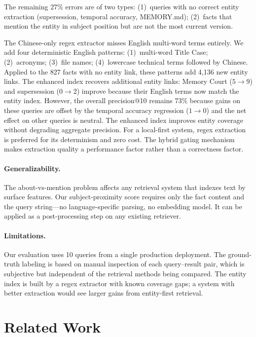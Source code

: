 \documentclass[11pt]{article}
\begin{document}
The remaining 27\% errors are of two types: (1)~queries with no correct entity extraction (supersession, temporal accuracy, MEMORY.md); (2)~facts that mention the entity in subject position but are not the most current version.

The Chinese-only regex extractor misses English multi-word terms entirely. We add four deterministic English patterns: (1)~multi-word Title Case; (2)~acronyms; (3)~file names; (4)~lowercase technical terms followed by Chinese. Applied to the 827 facts with no entity link, these patterns add 4,136 new entity links. The enhanced index recovers additional entity links: Memory Court ($5\to$9) and supersession ($0\to$2) improve because their English terms now match the entity index. However, the overall precision@10 remains 73\% because gains on these queries are offset by the temporal accuracy regression ($1\to$0) and the net effect on other queries is neutral. The enhanced index improves entity coverage without degrading aggregate precision. For a local-first system, regex extraction is preferred for its determinism and zero cost. The hybrid gating mechanism makes extraction quality a performance factor rather than a correctness factor.

\paragraph{Generalizability.} The about-vs-mention problem affects any retrieval system that indexes text by surface features. Our subject-proximity score requires only the fact content and the query string---no language-specific parsing, no embedding model. It can be applied as a post-processing step on any existing retriever.

\paragraph{Limitations.} Our evaluation uses 10 queries from a single production deployment. The ground-truth labeling is based on manual inspection of each query--result pair, which is subjective but independent of the retrieval methods being compared. The entity index is built by a regex extractor with known coverage gaps; a system with better extraction would see larger gains from entity-first retrieval.

\section{Related Work}
\end{document}
